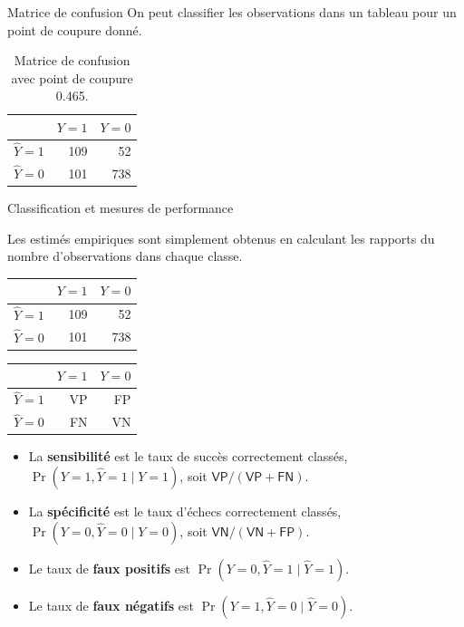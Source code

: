 \documentclass[
  ignorenonframetext,
]{beamer}
\providecommand{\tightlist}{%
  \setlength{\itemsep}{0pt}\setlength{\parskip}{0pt}}\usepackage{longtable,booktabs,array}
\begin{document}
\begin{frame}{Matrice de confusion}
\protect\hypertarget{matrice-de-confusion}{}
On peut classifier les observations dans un tableau pour un point de
coupure donné.

\hypertarget{tbl-confumat}{}
\begin{table}
\caption{\label{tbl-confumat}Matrice de confusion avec point de coupure 0.465. }\tabularnewline

\centering
\begin{tabular}{lrr}
\toprule
  & \(Y=1\) & \(Y=0\)\\
\midrule
\(\widehat{Y}=1\) & 109 & 52\\
\(\widehat{Y}=0\) & 101 & 738\\
\bottomrule
\end{tabular}
\end{table}
\end{frame}

\begin{frame}{Classification et mesures de performance}
\protect\hypertarget{classification-et-mesures-de-performance}{}
\footnotesize

Les estimés empiriques sont simplement obtenus en calculant les rapports
du nombre d'observations dans chaque classe.

\normalsize

\begin{table}

\begin{tabular}{lrr}
\toprule
  & \(Y=1\) & \(Y=0\)\\
\midrule
\(\widehat{Y}=1\) & 109 & 52\\
\(\widehat{Y}=0\) & 101 & 738\\
\bottomrule
\end{tabular}
\begin{tabular}{lrr}
\toprule
  & \(Y=1\) & \(Y=0\)\\
\midrule
\(\widehat{Y}=1\) & VP & FP\\
\(\widehat{Y}=0\) & FN & VN\\
\bottomrule
\end{tabular}
\end{table}

\begin{itemize}
\tightlist
\item
  La \textbf{sensibilité} est le taux de succès correctement classés,
  \(\Pr(Y=1, \widehat{Y}=1 \mid Y=1)\), soit
  \(\mathsf{VP}/(\mathsf{VP}+\mathsf{FN})\).
\item
  La \textbf{spécificité} est le taux d'échecs correctement classés,
  \(\Pr(Y=0, \widehat{Y}=0 \mid Y=0)\), soit
  \(\mathsf{VN}/(\mathsf{VN}+\mathsf{FP})\).
\item
  Le taux de \textbf{faux positifs} est
  \(\Pr(Y=0, \widehat{Y}=1 \mid \widehat{Y}=1)\).
\item
  Le taux de \textbf{faux négatifs} est
  \(\Pr(Y=1, \widehat{Y}=0 \mid \widehat{Y}=0)\).
\end{itemize}
\end{frame}
\end{document}
